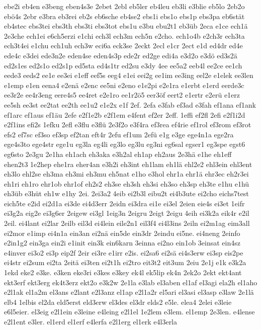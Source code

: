 {ebe2i
eb4en
e3beng
eben4s3e
2ebet
2ebl
eb5ler
eb4leu
eb3li
e3blie
eb5lo
2eb2o
ebö4s
2ebr
e3bra
eb3rei
eb2s
eb6sche
eb4se2
ebs1i
ebs1o
ebs1p
ebs3pa
eb6stät
eb4stec
ebs3tei
ebs3th
ebs3ti
ebs3tot
ebs1u
e3bu
ebu2t1
eb3üb
2eca
e1ce
ech1ä
2e3che
ech1ei
e6ch5erzi
e1chi
ech3l
ech3m
ech5n
e2cho.
ech1o4b
e2ch3r
ech3ta
ech3t4ei
e1chu
ech1uh
ech3w
eci6a
eck3se
2eckt
2ecl
e1cr
2ect
e1d
ed4dr
ed4e
ede4c
e3dei
ede3n2e
eden4se
eden4s3p
ede2r
ed2ge
edi4a
e3d2o
e3dö
ed3s2ä
ed2s1es
ed2s1o
ed2s1p
ed5sta
ed4s1tr
ed2su
e3dy
4ee
ee5a2
eeb4l
ee2ce
ee1ch
eede3
eeds2
ee1e
ee3ei
e1eff
eef5s
eeg4
e1ei
eei2g
ee1im
ee3ing
eel2e
e1elek
ee3len
e1emp
e1en
eena4
e2enä
e2enc
ee5ni
e2eno
e1e2pi
e2e1ra
e1erbt
e1erd
eerde3c
ee3r2e
ee4r3eng
eere4s5
ee4ret
e2e1ro
ee1r2ö5
eer3öf
eert2
e1ertr
e2erü
e1erz
ee5sh
ee3st
ee2tat
ee2th
ee1u2
e1e2x
e1f
2ef.
2efa
e3fab
ef3ad
e3fah
ef1ana
ef1ank
ef1arc
ef1aus
ef1äu
2efe
e2f1e2b
e2f1em
e4fent
ef2er
2eff.
1effi
ef2fl
2efi
e2f1i2d
e2f1ins
efi2s
1efku
2efl
e3flu
e3flü
2e3f2o
e3f4ra
ef3rea
ef4rie
ef1rol
ef3rom
ef3rot
efs2
ef7sc
ef3so
ef3sp
ef2tan
eft4r
2efu
ef1um
2efü
e1g
e3ge
ege4n1a
ege2ra
ege4s3to
ege4str
ege1u
eg3la
eg4li
eg3lo
eg3lu
eg3ni
eg6sal
egser1
eg3spe
egst6
eg6sto
2e3gu
2e1ha
eh1ach
eh3aka
e3h2al
eh1ap
eh2aus
2e3hä
e1he
eh1eff
ehen2t3
1e2hep
ehe1ra
eher4an
e3h2i
eh3int
eh1lam
eh1lä
ehl2e2
ehl3ein
ehl3ent
eh3lo
ehl2se
eh3ma
eh3mi
eh3mu
eh5nat
e1ho
e3hol
ehr1a
ehr1ä
ehr3ec
eh2r3ei
eh1ri
eh1ro
ehr1ob
ehr1of
eh2s2
eh3se
eh3sh
eh3si
eh3so
eh3sp
eh3te
e1hu
e1hü
eh3üb
e3hüt
eh1w
e1hy
2ei.
2ei3a2
4eib
ei2b3l
eibu2t
ei4b3ute
ei2cho
eichs7test
eich5te
e2id
ei2d1a
ei3de
ei4d3err
2eidn
ei3dra
ei1e
ei3el
2eien
eie4s
ei3et
1eifr
ei3g2a
eig2e
ei3g6er
2eigew
ei3gl
1eig3n
2eigru
2eigt
2eigu
4eih
ei3k2a
eik4r
e2il
2eil.
ei4lant
ei2lar
2eilb
eil3d
ei4lein
eile2n1
eil3f4
ei4l3ins
2eiln
ei2m1ag
eim3all
ei2mor
e1imp
ei4n1a
ein3an
ei2nä
ein5de
ein3dr
2eindu
ei5ne.
ei4neng
2einfo
e2in1g2
ein3ga
ein2i
e1init
ein3k
ein6karn
3einna
ei2no
ein1ob
3einsat
ein4sz
e4inver
ei3o2
ei3p
eip2f
2eir
ei3re
e1irr
e2is.
ei2sa6
ei2sä
ei4s3erw
ei3sp
eis2pe
ei4str
ei2sum
ei2ta
2eitä
ei3ten
ei2t1h
ei2tro
eit3t2
eit3um
2eiu
2e1j
e1k
e3k2a
1ekd
eke2
e3ke.
e3ken
eke3ri
e3kes
e3key
ek4l
ek5lip
ek4n
2ek2o
2ekt
ekt4ant
ekt3erf
ekt3erg
ek4t3erz
ekt2o
e3k2w
2e1la
e3lab
el3aben
el1af
el3agi
ela2h
el1aho
e2l1ak
el1a2m
el3ans
e2lant
e2l3anz
el1ap
e2l1a2r
el5ari
el3asi
el3asp
e3law
2e1lä
elb4
1elbis
el2da
eld5erst
eld3erw
el3des
el3dr
elds2
e5le.
elea4
2elei
e3leie
e6l5eier.
el3eig
e2l1ein
e3leine
e4leing
e2l1el
1e2lem
e3lem.
el1emp
2e3len.
e4lense
e2l1ent
e3ler.
el1erd
el1erf
e4lerfa
e2l1erg
el1erk
e4l3erla
}
